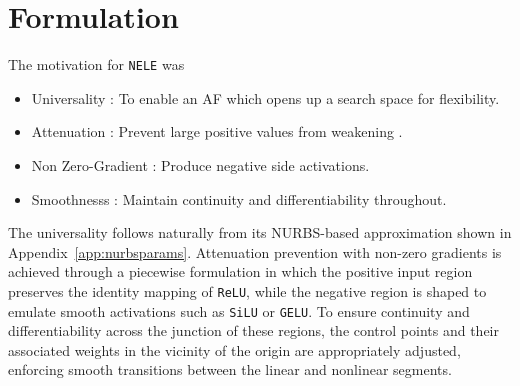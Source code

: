 \documentclass{article}
\begin{document}
\section{Formulation}\label{sec:form}
The motivation for \texttt{NELE} was 
\begin{itemize}
\item Universality : To enable an AF which opens up a search 
space for flexibility.
\item Attenuation : Prevent large positive values from weakening \cite{elfwing2017sigmoidweightedlinearunitsneural}.
\item Non Zero-Gradient : Produce negative side activations.
\item Smoothnesss : Maintain continuity and differentiability throughout.
\end{itemize} 

The universality follows naturally from its 
NURBS-based approximation shown in Appendix~\ref{app:nurbsparams}. Attenuation prevention with non-zero gradients 
is achieved through a piecewise formulation in which the 
positive input region preserves the identity mapping of \texttt{ReLU}, 
while the negative region is shaped to emulate smooth activations such as 
\texttt{SiLU} or \texttt{GELU}. To ensure continuity and differentiability 
across the junction of these regions, the control points and their 
associated weights in the vicinity of the origin are appropriately adjusted, 
enforcing smooth transitions between the linear and nonlinear segments.
\end{document}
